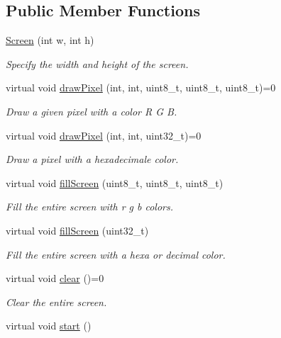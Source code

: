 \subsection*{Public Member Functions}
\begin{DoxyCompactItemize}
\item 
\hyperlink{class_screen_a4fd315da02eebd632bdae444496c10ca}{Screen} (int w, int h)
\begin{DoxyCompactList}\small\item\em Specify the width and height of the screen. \end{DoxyCompactList}\item 
virtual void \hyperlink{class_screen_a29b3d5ac1b1f9965daa31be3acb2058e}{draw\+Pixel} (int, int, uint8\+\_\+t, uint8\+\_\+t, uint8\+\_\+t)=0
\begin{DoxyCompactList}\small\item\em Draw a given pixel with a color R G B. \end{DoxyCompactList}\item 
virtual void \hyperlink{class_screen_a01e3bb789c4169dec25e842179b7b115}{draw\+Pixel} (int, int, uint32\+\_\+t)=0
\begin{DoxyCompactList}\small\item\em Draw a pixel with a hexadecimale color. \end{DoxyCompactList}\item 
virtual void \hyperlink{class_screen_a7561ce620e5dd79717bced178e32e139}{fill\+Screen} (uint8\+\_\+t, uint8\+\_\+t, uint8\+\_\+t)
\begin{DoxyCompactList}\small\item\em Fill the entire screen with r g b colors. \end{DoxyCompactList}\item 
virtual void \hyperlink{class_screen_a6e3a21e03ec2a378c9be90b7a0a149b2}{fill\+Screen} (uint32\+\_\+t)
\begin{DoxyCompactList}\small\item\em Fill the entire screen with a hexa or decimal color. \end{DoxyCompactList}\item 
virtual void \hyperlink{class_screen_aeeb33479781ffe35c4f1c90cd66824aa}{clear} ()=0
\begin{DoxyCompactList}\small\item\em Clear the entire screen. \end{DoxyCompactList}\item 
virtual void \hyperlink{class_screen_a72c3f62745b4b863edb9e95d10057429}{start} ()

\end{DoxyCompactItemize}
